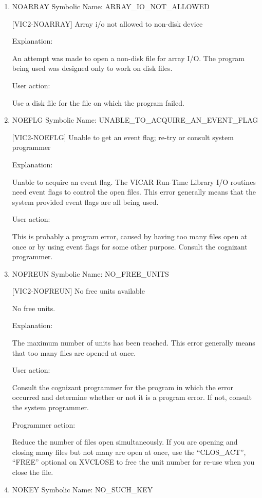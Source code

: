 \begin{enumerate}
\item NOARRAY Symbolic Name: ARRAY\_IO\_NOT\_ALLOWED

[VIC2-NOARRAY] Array i/o not allowed to non-disk device

Explanation:

An attempt was made to open a non-disk file for array I/O.
The program being used was designed only to work on disk files.

User action:

Use a disk file for the file on which the program failed.


\item NOEFLG Symbolic Name: UNABLE\_TO\_ACQUIRE\_AN\_EVENT\_FLAG

[VIC2-NOEFLG] Unable to get an event flag; re-try or consult system programmer

Explanation:

Unable to acquire an event flag.  The VICAR Run-Time Library
I/O routines need event flags to control the open files.
This error generally means that the system provided event
flags are all being used.

User action:

This is probably a program error, caused by having too many
files open at once or by using event flags for some other
purpose.  Consult the cognizant programmer.


\item NOFREUN Symbolic Name: NO\_FREE\_UNITS

[VIC2-NOFREUN] No free units available

No free units.

Explanation:

The maximum number of units has been reached.  This error generally
means that too many files are opened at once.

User action:

Consult the cognizant programmer for the program in which the
error occurred and determine whether or not it is a program error.
If not, consult the system programmer.

Programmer action:

Reduce the number of files open simultaneously.  If you are opening
and closing many files but not many are open at once, use the
``CLOS\_ACT'', ``FREE'' optional on XVCLOSE to free the unit
number for re-use when you close the file.


\item NOKEY Symbolic Name: NO\_SUCH\_KEY


\end{enumerate}
